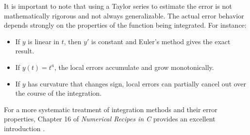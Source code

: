     It is important to note that using a Taylor series to estimate the error is not mathematically rigorous and not always generalizable. The actual error behavior depends strongly on the properties of the function being integrated. For instance:
    \begin{itemize}
        \item If \( y \) is linear in \( t \), then \( y' \) is constant and Euler's method gives the exact result.
        \item If \( y(t) = t^a \), the local errors accumulate and grow monotonically.
        \item If \( y \) has curvature that changes sign, local errors can partially cancel out over the course of the integration.
    \end{itemize}
    For a more systematic treatment of integration methods and their error properties, Chapter 16 of \textit{Numerical Recipes in C} provides an excellent introduction \parencite{1992nrca.book.....P}.

